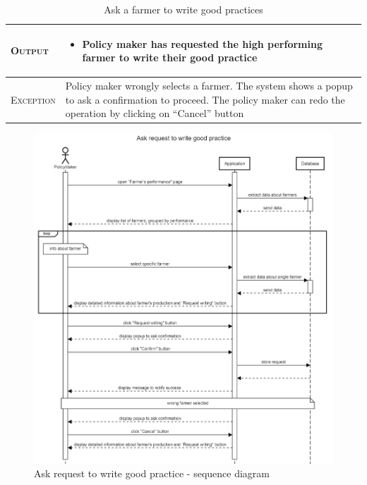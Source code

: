 \begin{table}[H]
\begin{tabular}{|l|p{}|}
    	\hline %
    	\textsc{Output}             &  \begin{itemize}
    	    \item Policy maker has requested the high performing farmer to write their good practice
    	\end{itemize}\\
    	\hline %
    	\textsc{Exception}         &  Policy maker wrongly selects a farmer. The 
    	system shows a popup to ask a confirmation to proceed. The policy maker can redo the operation by clicking on “Cancel” button\\
    	\hline %
        
    \end{tabular}
    \caption{\label{tab:visualize_iprovement}Ask a farmer to write good practices} 
\end{table}

\begin{figure}[H]
    \centering
    \includegraphics[scale=0.5]{Images/Sequence diagrams/SE2 - Ask request to write good practice (pm).png}
    \caption{Ask request to write good practice - sequence diagram}
    \label{fig:my_label}
\end{figure}

